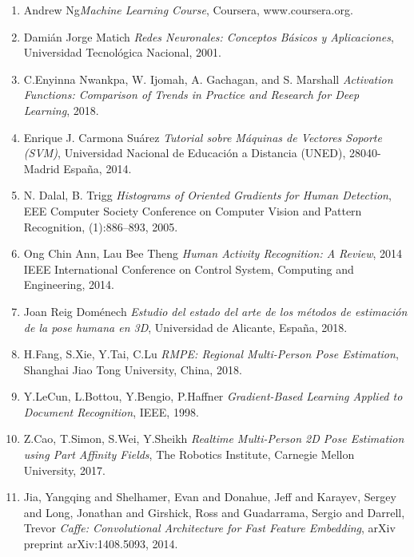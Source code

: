 \documentclass[a4paper,12pt,oneside,spanish]{book}
\begin{document}
\begin{enumerate}
	\item Andrew Ng\textit{Machine Learning Course}, Coursera, www.coursera.org. 
	
	\item Damián Jorge Matich \textit{Redes Neuronales: Conceptos Básicos y Aplicaciones}, Universidad Tecnológica Nacional, 2001. 
	
	\item C.Enyinna Nwankpa, W. Ijomah, A. Gachagan, and S. Marshall \textit{Activation Functions: Comparison of Trends in Practice and Research for Deep Learning}, 2018.
	
	\item Enrique J. Carmona Suárez \textit{Tutorial sobre Máquinas de Vectores Soporte (SVM)}, Universidad Nacional de Educación a Distancia (UNED), 28040-Madrid España, 2014.
	
	\item N. Dalal, B. Trigg \textit{Histograms of Oriented Gradients for Human Detection}, EEE Computer Society Conference on Computer Vision and Pattern Recognition, (1):886–893, 2005.
	
	\item Ong Chin Ann, Lau Bee Theng \textit{Human Activity Recognition: A Review}, 2014 IEEE International Conference on Control System, Computing and Engineering, 2014.
	
	\item Joan Reig Doménech \textit{Estudio del estado del arte de los métodos de estimación de la pose humana en 3D}, Universidad de Alicante, España, 2018.
	
	\item H.Fang, S.Xie, Y.Tai, C.Lu \textit{RMPE: Regional Multi-Person Pose Estimation}, Shanghai Jiao Tong University, China, 2018.
	
	\item Y.LeCun, L.Bottou, Y.Bengio, P.Haffner \textit{Gradient-Based Learning Applied to Document Recognition}, IEEE, 1998.
	
	\item Z.Cao, T.Simon, S.Wei, Y.Sheikh \textit{Realtime Multi-Person 2D Pose Estimation using Part Affinity Fields}, The Robotics Institute, Carnegie Mellon University, 2017.

	\item Jia, Yangqing and Shelhamer, Evan and Donahue, Jeff and Karayev, Sergey and Long, Jonathan and Girshick, Ross and Guadarrama, Sergio and Darrell, Trevor \textit{Caffe: Convolutional Architecture for Fast Feature Embedding}, arXiv preprint arXiv:1408.5093, 2014.
	

\end{enumerate}
\end{document}
